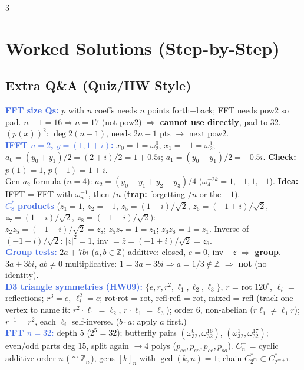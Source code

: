 \documentclass[9pt]{extarticle}
\newcommand{\hl}[1]{\textbf{\textcolor{BrickRed}{#1}}}
\newcommand{\wk}[1]{\textbf{\textcolor{OliveGreen}{#1}}}
\newcommand{\ex}[1]{\textbf{\textcolor{RoyalBlue}{#1}}}
\begin{document}
\begin{multicols}{3}
\section{Worked Solutions (Step-by-Step)}
\subsection{Extra Q\&A (Quiz/HW Style)}
\begin{sloppypar}\raggedright
\ex{FFT size Qs:} $p$ with $n$ coeffs needs $n$ points forth+back; FFT needs pow2 so pad. $n{-}1{=}16\Rightarrow n{=}17$ (not pow2) $\Rightarrow$ \hl{cannot use directly}, pad to $32$. $(p(x))^2$: $\deg2(n{-}1)$, needs $2n{-}1$ pts $\to$ next pow2.\\
\ex{IFFT $n{=}2$, $y{=}(1,1{+}i)$:} $x_0{=}1{=}\omega_2^0$, $x_1{=}{-}1{=}\omega_2^1$; $a_0{=}(y_0{+}y_1)/2{=}(2{+}i)/2{=}1{+}0.5i$; $a_1{=}(y_0{-}y_1)/2{=}{-}0.5i$. \wk{Check:} $p(1){=}1$, $p({-}1){=}1{+}i$.\\
Gen $a_2$ formula ($n{=}4$): $a_2{=}(y_0{-}y_1{+}y_2{-}y_3)/4$ ($\omega_4^{-2k}{=}1,{-}1,1,{-}1$). \wk{Idea:} IFFT = FFT with $\omega_n^{-1}$, then $/n$ (\hl{trap:} forgetting $/n$ or the ${-}1$).\\
\ex{$C_8^*$ products} ($z_1{=}1$, $z_2{=}{-}1$, $z_5{=}(1{+}i)/\sqrt2$, $z_6{=}({-}1{+}i)/\sqrt2$, $z_7{=}(1{-}i)/\sqrt2$, $z_8{=}({-}1{-}i)/\sqrt2$):\\
$z_2z_5{=}({-}1{-}i)/\sqrt2{=}z_8$; $z_5z_7{=}1{=}z_1$; $z_6z_8{=}1{=}z_1$. Inverse of $({-}1{-}i)/\sqrt2$: $|z|^2{=}1$, inv ${=}\bar z{=}({-}1{+}i)/\sqrt2{=}z_6$.\\
\ex{Group tests:} $2a{+}7bi$ ($a,b{\in}\mathbb Z$) additive: closed, $e{=}0$, inv ${-}z$ $\Rightarrow$ \hl{group}. $3a{+}3bi$, $ab{\ne}0$ multiplicative: $1{=}3a{+}3bi\Rightarrow a{=}1/3{\notin}\mathbb Z$ $\Rightarrow$ \hl{not} (no identity).\\
\ex{D3 triangle symmetries (HW09):} $\{e,r,r^2,\ell_1,\ell_2,\ell_3\}$, $r$ = rot $120^{\circ}$, $\ell_i$ = reflections; $r^3{=}e$, $\ell_i^2{=}e$; rot${\cdot}$rot = rot, refl${\cdot}$refl = rot, mixed = refl (track one vertex to name it: $r^2{\cdot}\ell_1{=}\ell_2$, $r{\cdot}\ell_1{=}\ell_3$); order 6, non-abelian ($r\ell_1{\ne}\ell_1r$); $r^{-1}{=}r^2$, each $\ell_i$ self-inverse. ($b{\cdot}a$: apply $a$ first.)\\
\ex{FFT $n{=}32$:} depth $5$ ($2^5{=}32$); butterfly pairs $(\omega_{32}^0,\omega_{32}^{16})$, $(\omega_{32}^1,\omega_{32}^{17})$; even/odd parts deg $15$, split again $\to4$ polys ($p_{ee},p_{eo},p_{oe},p_{oo}$). $C_n^+$ = cyclic additive order $n$ (${\cong}\mathbb Z_n^+$), gens $[k]_n$ with $\gcd(k,n){=}1$; chain $C_{2^m}^*{\subset}C_{2^{m+1}}^*$.

\end{sloppypar}
\end{multicols}
\end{document}
